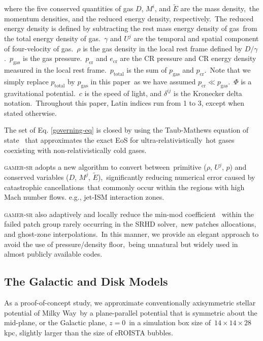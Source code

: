 \documentclass[fleqn,usenatbib,useAMS]{mnras}
\begin{document}
  where the five conserved quantities of gas $D$, $M^{i}$, and $\tilde{E}$ are the mass density,\
  the momentum densities, and the reduced energy density, respectively.\
  The reduced energy density is defined by subtracting the rest mass energy density of gas\
  from the total energy density of gas.\
  $\gamma$ and $U^{j}$ are the temporal and spatial component of four-velocity of gas.\
  $\rho$ is the gas density in the local rest frame defined by $D/\gamma$.\
  $p_{\text{gas}}$ is the gas pressure.\
  $p_{\text{cr}}$ and $e_{\text{cr}}$ are the CR pressure and CR energy density measured in the local rest frame.\
  $p_{\text{total}}$ is the sum of $p_{\text{gas}}$ and $p_{\text{cr}}$.\
  Note that we simply replace $p_{\text{total}}$ by $p_{\text{gas}}$ in this paper\
  as we have assumed $p_{\text{cr}}\ll p_{\text{gas}}$.\
  $\Phi$ is a gravitational potential.\
  $c$ is the speed of light, and $\delta^{ij}$ is the Kronecker delta notation.\
  Throughout this paper, Latin indices run from 1 to 3, except when stated otherwise.\

  The set of Eq. \ref{governing-eq} is closed by using the Taub-Mathews equation of state \citep{Taub,TM_EOS}\
  that approximates the exact EoS \citep{Synge} for ultra-relativistically\
  hot gases coexisting with non-relativistically cold gases.

  \textsc{gamer-sr} adopts a new algorithm \citep{tseng2021} to convert between\
  primitive ($\rho$, $U^{j}$, $p$) and conserved variables ($D$, $M^{j}$, $\tilde{E}$),\
  significantly reducing numerical error caused by catastrophic cancellations\
  that commonly occur within the regions with high Mach number flows. e.g., jet-ISM interaction zones.

  \textsc{gamer-sr} also adaptively and locally reduce the min-mod coefficient\
  \citep{tseng2021} within the failed patch group rarely occurring in the SRHD solver,\
  new patches allocations, and ghost-zone interpolations.\
  In this manner, we provide an elegant approach to avoid the use of pressure/density floor,\
  being unnatural but widely used in almost publicly available codes.\

  \subsection{The Galactic and Disk Models}
  As a proof-of-concept study, we approximate conventionally axisymmetric stellar potential of Milky Way\
  by a plane-parallel potential that is symmetric about the mid-plane, or the Galactic plane, $z=0$\
  in a simulation box size of\
  $14\times14\times28$ kpc, slightly larger than the size of eROISTA bubbles.
\end{document}
